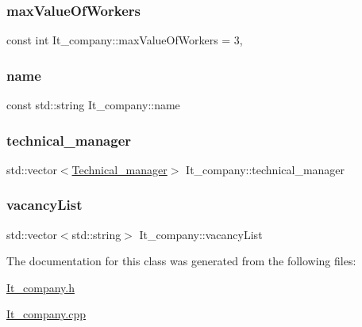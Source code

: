 \subsubsection{\texorpdfstring{max\+Value\+Of\+Workers}{maxValueOfWorkers}}
{\footnotesize\ttfamily const int It\+\_\+company\+::max\+Value\+Of\+Workers = 3\hspace{0.3cm}{\ttfamily [static]}, {\ttfamily [private]}}

\hypertarget{class_it__company_a99894304639dab6b416f697dc7e81d52}{}\label{class_it__company_a99894304639dab6b416f697dc7e81d52} 
\subsubsection{\texorpdfstring{name}{name}}
{\footnotesize\ttfamily const std\+::string It\+\_\+company\+::name\hspace{0.3cm}{\ttfamily [private]}}

\hypertarget{class_it__company_af2285094fb07bcf0a9f3a4c1d8a407d3}{}\label{class_it__company_af2285094fb07bcf0a9f3a4c1d8a407d3} 
\subsubsection{\texorpdfstring{technical\+\_\+manager}{technical\_manager}}
{\footnotesize\ttfamily std\+::vector$<$\hyperlink{class_technical__manager}{Technical\+\_\+manager}$>$ It\+\_\+company\+::technical\+\_\+manager}

\hypertarget{class_it__company_a06d700346a5bcd94c1f265f3bb65143f}{}\label{class_it__company_a06d700346a5bcd94c1f265f3bb65143f} 
\subsubsection{\texorpdfstring{vacancy\+List}{vacancyList}}
{\footnotesize\ttfamily std\+::vector$<$std\+::string$>$ It\+\_\+company\+::vacancy\+List\hspace{0.3cm}{\ttfamily [private]}}



The documentation for this class was generated from the following files\+:\begin{DoxyCompactItemize}
\item 
\hyperlink{_it__company_8h}{It\+\_\+company.\+h}\item 
\hyperlink{_it__company_8cpp}{It\+\_\+company.\+cpp}\end{DoxyCompactItemize}
